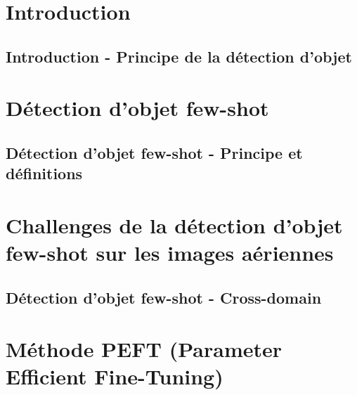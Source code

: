 \documentclass[xcolor=table, 8pt]{beamer}
\begin{document}
    \maketitle
    


    \section{Introduction}\label{sec:od-fsod}

    \subsection{Introduction - Principe de la détection d'objet}\label{subsec:object-detection}
    


    \section{Détection d'objet few-shot}\label{sec:fs-od-fsod}

    \subsection{Détection d'objet few-shot - Principe et définitions}\label{subsec:fs-od-definition}
    

    \section{Challenges de la détection d'objet few-shot sur les images aériennes}\label{sec:fs-od-challenges}
    
    

    \subsection{Détection d'objet few-shot - Cross-domain}\label{subsec:fs-od-cd}
    

    \section{Méthode PEFT (Parameter Efficient Fine-Tuning)}\label{sec:peft}
\end{document}
